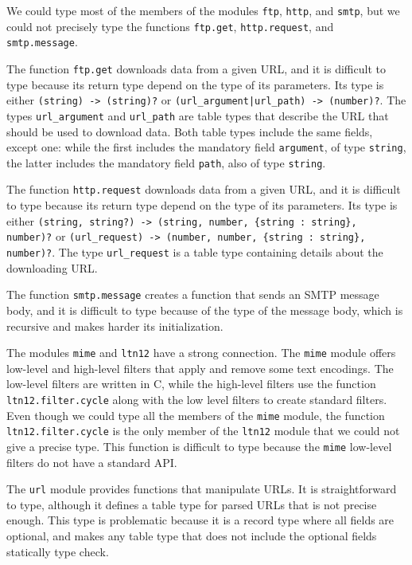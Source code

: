We could type most of the members of the modules \texttt{ftp},
\texttt{http}, and \texttt{smtp}, but we could not precisely type
the functions \texttt{ftp.get}, \texttt{http.request}, and
\texttt{smtp.message}.

The function \texttt{ftp.get} downloads data from a given URL,
and it is difficult to type because its return type depend on
the type of its parameters.
Its type is either \texttt{(string) -> (string)?} or
\texttt{(url\string_argument|url\string_path) -> (number)?}.
The types \texttt{url\string_argument} and \texttt{url\string_path}
are table types that describe the URL that should be used to
download data.
Both table types include the same fields, except one:
while the first includes the mandatory field \texttt{argument},
of type \texttt{string}, the latter includes the mandatory field
\texttt{path}, also of type \texttt{string}.

The function \texttt{http.request} downloads data from a given URL,
and it is difficult to type because its return type depend on
the type of its parameters.
Its type is either
\texttt{(string, string?) -> (string, number, \{string : string\}, number)?} or
\texttt{(url\string_request) -> (number, number, \{string : string\}, number)?}.
The type \texttt{url\string_request} is a table type containing
details about the downloading URL.

The function \texttt{smtp.message} creates a function that sends
an SMTP message body, and it is difficult to type because of the
type of the message body, which is recursive and makes harder
its initialization.

The modules \texttt{mime} and \texttt{ltn12} have a strong connection.
The \texttt{mime} module offers low-level and high-level filters
that apply and remove some text encodings.
The low-level filters are written in C, while the high-level filters
use the function \texttt{ltn12.filter.cycle} along with the low level
filters to create standard filters.
Even though we could type all the members of the \texttt{mime} module,
the function \texttt{ltn12.filter.cycle} is the only member of the
\texttt{ltn12} module that we could not give a precise type.
This function is difficult to type because the \texttt{mime} low-level
filters do not have a standard API.

The \texttt{url} module provides functions that manipulate URLs.
It is straightforward to type, although it defines a table type for
parsed URLs that is not precise enough. 
This type is problematic because it is a record type where all
fields are optional, and makes any table type that does not include
the optional fields statically type check.

